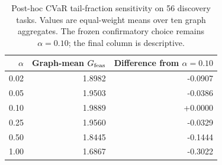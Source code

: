 \begin{table}[t]
\centering
\caption{Post-hoc CVaR tail-fraction sensitivity on 56 discovery tasks.
Values are equal-weight means over ten graph aggregates. The frozen
confirmatory choice remains $\alpha=0.10$; the final column is descriptive.}
\label{tab:reviewer-alpha}
\small
\begin{tabular}{@{}rrr@{}}
\toprule
$\alpha$ & Graph-mean $G_{\mathrm{feas}}$ & Difference from $\alpha=0.10$ \\
\midrule
0.02 & 1.8982 & -0.0907 \\
0.05 & 1.9503 & -0.0386 \\
0.10 & 1.9889 & +0.0000 \\
0.25 & 1.9560 & -0.0329 \\
0.50 & 1.8445 & -0.1444 \\
1.00 & 1.6867 & -0.3022 \\
\bottomrule
\end{tabular}
\end{table}
